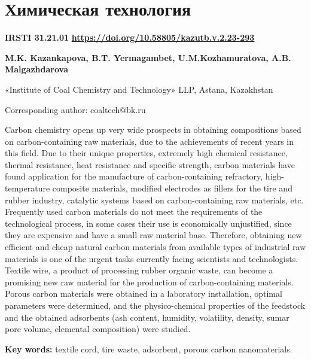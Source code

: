 \let\cleardoublepage\clearpage
\chapter{Химическая технология}

{\bfseries IRSTI 31.21.01}
\hfill {\bfseries \href{https://doi.org/10.58805/kazutb.v.2.23-293}{https://doi.org/10.58805/kazutb.v.2.23-293}}


\begin{center}
{\bfseries M.K. Kazankapova, B.T. Yermagambet, U.M.Kozhamuratova, A.B. Malgazhdarova}

«Institute of Coal Chemistry and Technology» LLP, Astana, Kazakhstan

Corresponding author: coaltech@bk.ru
\end{center}

Carbon chemistry opens up very wide prospects in obtaining compositions
based on carbon-containing raw materials, due to the achievements of
recent years in this field. Due to their unique properties, extremely
high chemical resistance, thermal resistance, heat resistance and
specific strength, carbon materials have found application for the
manufacture of carbon-containing refractory, high-temperature composite
materials, modified electrodes as fillers for the tire and rubber
industry, catalytic systems based on carbon-containing raw materials,
etc. Frequently used carbon materials do not meet the requirements of
the technological process, in some cases their use is economically
unjustified, since they are expensive and have a small raw material
base. Therefore, obtaining new efficient and cheap natural carbon
materials from available types of industrial raw materials is one of the
urgent tasks currently facing scientists and technologists. Textile
wire, a product of processing rubber organic waste, can become a
promising new raw material for the production of carbon-containing
materials. Porous carbon materials were obtained in a laboratory
installation, optimal parameters were determined, and the
physico-chemical properties of the feedstock and the obtained adsorbents
(ash content, humidity, volatility, density, sumar pore volume,
elemental composition) were studied.

{\bfseries Key words:} textile cord, tire waste, adsorbent, porous carbon
nanomaterials.


